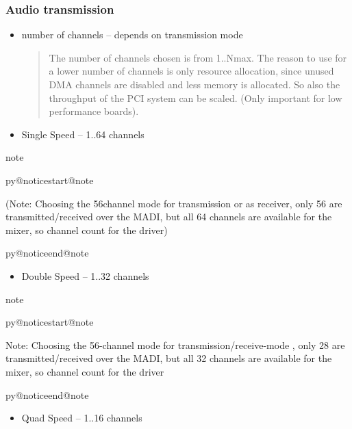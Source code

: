\documentclass[a4paper,8pt,english]{sphinxmanual}
\makeatletter
\renewenvironment{notice}[2]{%
          \def\py@noticetype{#1}
          \begin{coloredbox}{#1}
          \bf\it
          \par\strong{#2}
          \csname py@noticestart@#1\endcsname
        }
	{
          \csname py@noticeend@\py@noticetype\endcsname
          \end{coloredbox}
        }
\makeatother
\begin{document}
\subsubsection{Audio transmission}
\label{sound/cards/hdspm:audio-transmission}\begin{itemize}
\item {} 
number of channels --  depends on transmission mode
\begin{quote}

The number of channels chosen is from 1..Nmax. The reason to
use for a lower number of channels is only resource allocation,
since unused DMA channels are disabled and less memory is
allocated. So also the throughput of the PCI system can be
scaled. (Only important for low performance boards).
\end{quote}

\item {} 
Single Speed -- 1..64 channels

\end{itemize}

\begin{notice}{note}{Note:}
(Note: Choosing the 56channel mode for transmission or as
receiver, only 56 are transmitted/received over the MADI, but
all 64 channels are available for the mixer, so channel count
for the driver)
\end{notice}
\begin{itemize}
\item {} 
Double Speed -- 1..32 channels

\end{itemize}

\begin{notice}{note}{Note:}
Note: Choosing the 56-channel mode for
transmission/receive-mode , only 28 are transmitted/received
over the MADI, but all 32 channels are available for the mixer,
so channel count for the driver
\end{notice}
\begin{itemize}
\item {} 
Quad Speed -- 1..16 channels

\end{itemize}
\end{document}
